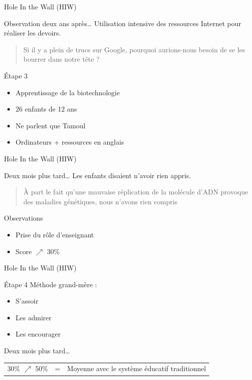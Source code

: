 \begin{frame}{Hole In the Wall (HIW)}
\begin{block}{Observation deux ans après\ldots}
  Utilisation intensive des ressources Internet pour réaliser les devoirs.
\end{block}
\pause
\begin{quote}
Si il y a plein de trucs sur Google, pourquoi aurions-nous besoin de se les bourrer dans notre tête ?
\end{quote}
\pause
  \begin{block}{Étape 3}
    \begin{itemize}
      \item Apprentissage de la biotechnologie
      \item 26 enfants de 12 ans
      \item Ne parlent que Tamoul
      \item Ordinateurs + ressources en anglais
    \end{itemize}
  \end{block}
\end{frame}

\begin{frame}{Hole In the Wall (HIW)}
  \begin{block}{Deux mois plus tard\ldots}
    Les enfants disaient n'avoir rien appris.
    \pause
    
    \begin{quote}
    À part le fait qu'une mauvaise réplication de la molécule d'ADN provoque des maladies génétiques, nous n'avons rien compris
    \end{quote}
    Observations
    \begin{itemize}
      \item Prise du rôle d'enseignant
      \item Score $\nearrow$ 30\%
    \end{itemize}
  \end{block}
\end{frame}

\begin{frame}{Hole In the Wall (HIW)}
  \begin{block}{Étape 4}
    Méthode grand-mère :
    \begin{itemize}
      \item S'assoir
      \item Les admirer
      \item Les encourager
    \end{itemize}
  \end{block}
  \pause
  \begin{block}{Deux mois plus tard\ldots}
  \begin{tabular}{l c l}
  30\% $\nearrow$ 50\% &=& Moyenne avec le système éducatif traditionnel \\
  \end{tabular}
  \end{block}
\end{frame}

